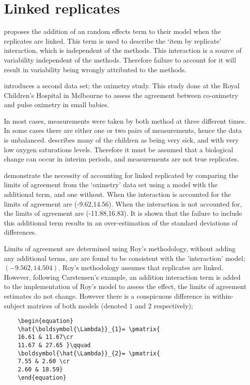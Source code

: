 \documentclass[12pt, a4paper]{report}
\theoremstyle{plain}
\theoremstyle{definition}
\theoremstyle{remark}
\begin{document}

	
	\section{Linked replicates}
	
	\citet{BXC2008} proposes the addition of an random effects term to their model when the replicates are linked. This term is used to describe the `item by replicate' interaction, which is independent of the methods. This interaction is a source of variability independent of the methods. Therefore failure to account for it will result in variability being wrongly attributed to the methods.
	
	\citet{BXC2008} introduces a second data set; the oximetry study. This study done at the Royal Children's Hospital in
	Melbourne to assess the agreement between co-oximetry and pulse oximetry in small babies.
	
	In most cases, measurements were taken by both method at three different times. In some cases there are either one or two pairs of measurements, hence the data is unbalanced. \citet{BXC2008} describes many of the children as being very sick, and with very low oxygen saturations levels. Therefore it must be assumed that a biological change can occur in interim periods, and measurements are not true replicates.
	
	\citet{BXC2008} demonstrate the necessity of accounting for linked replicated by comparing the limits of agreement from the `oximetry' data set using a model with the additional term, and one without. When the interaction is accounted for the limits of agreement are (-9.62,14.56). When the interaction is not accounted for, the limits of agreement are (-11.88,16.83). It is shown that the failure to include this additional term results in an over-estimation of the standard deviations of differences.
	
	Limits of agreement are determined using Roy's methodology, without adding any additional terms, are are found to be consistent with the 'interaction' model; $(-9.562, 14.504 )$. Roy's methodology assumes that replicates are linked. However, following Carstensen's example, an addition interaction term is added to the implementation of Roy's model to assess the effect, the limits of agreement estimates do not change. However there is a conspicuous difference in within-subject matrices of both models (denoted $1$ and $2$ respectively);
	\begin{verbatim}
	\begin{equation}
	\hat{\boldsymbol{\Lambda}}_{1}= \pmatrix{
	16.61 &	11.67\cr
	11.67 & 27.65 }\qquad
	\boldsymbol{\hat{\Lambda}}_{2}= \pmatrix{
	7.55 & 2.60 \cr
	2.60 & 18.59}
	\end{equation}
	\end{verbatim}
	
\end{document}
